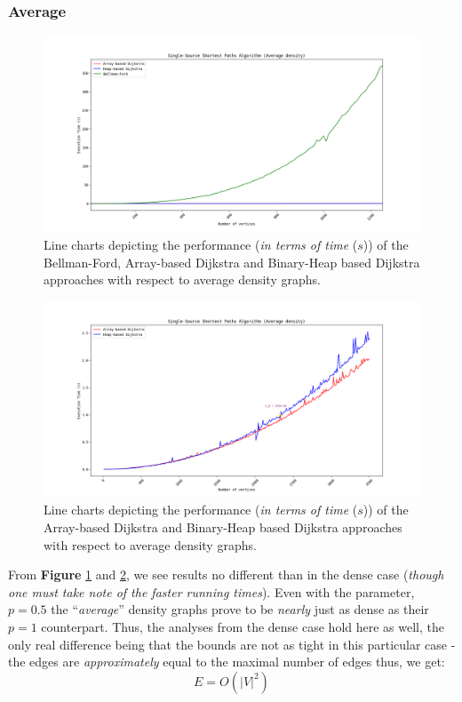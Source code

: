 \documentclass[a4paper, 12pt]{report}
\theoremstyle{definition}
\begin{document}
\subsubsection{Average}

\begin{figure}[H]
  \centering
  \includegraphics[width=5.5in]{all_average_01.png}
  \caption{Line charts depicting the performance (\emph{in terms of time} (\(s\))) of the Bellman-Ford, Array-based Dijkstra and Binary-Heap based Dijkstra approaches with respect to average density graphs.}
  \label{fig8:avg1}
\end{figure}

\begin{figure}[H]
  \centering
  \includegraphics[width=5.5in]{all_average_02.png}
  \caption{Line charts depicting the performance (\emph{in terms of time} (\(s\))) of the Array-based Dijkstra and Binary-Heap based Dijkstra approaches with respect to average density graphs.}
  \label{fig9:avg2}
\end{figure}

From \textbf{Figure} \ref{fig8:avg1} and \ref{fig9:avg2}, we see results no different than in the dense case (\emph{though one must take note of the faster running times}). Even with the parameter, \(p = 0.5\)
the ``\emph{average}'' density graphs prove to be \emph{nearly} just as dense as their \(p=1\) counterpart. Thus, the analyses from the dense case hold here as well, the only real difference being that the bounds are not
as tight in this particular case - the edges are \emph{approximately} equal to the maximal number of edges thus, we get:
\begin{equation}
  \label{eq2:relation}
  E = O(|V|^{2})
\end{equation}
\end{document}
